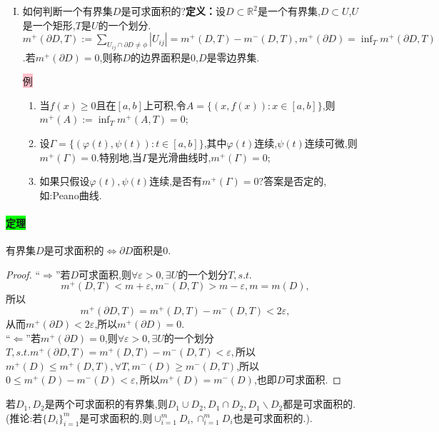 \documentclass[UTF8]{ctexart}
\renewcommand{\d}{\mathrm{d}}
\begin{document}
\begin{enumerate}[I)]
\begin{enumerate}[$\cdot$)]
\begin{enumerate}[1)]
\begin{proof}
                    又因为$f$可积,所以$\lim_{\lambda\to0}\sum_{i=1}^nm_i\Delta x_i=\lim_{\lambda\to0}\sum_{i=1}^nM_i\Delta x_i=\int_a^bf(x)\d x$,也即$m^-(D)=m^+(D)=\int_a^bf(x)\d x$,从而$D$是可求面积的,而且$m(D)=\int_a^bf(x)\d x$.
                \end{proof}
            \end{enumerate}
        \end{enumerate}
        \item 如何判断一个有界集$D$是可求面积的?\textbf{定义：}设$D\subset\mathbb{R}^2$是一个有界集,$D\subset U$,$U$是一个矩形,$T$是$U$的一个划分.$m^+(\partial D,T):=\sum_{U_{ij}\cap\partial D\not=\phi}|U_{ij}|=m^+(D,T)-m^-(D,T),m^+(\partial D)=\inf_Tm^+(\partial D,T)$.若$m^+(\partial D)=0$,则称$D$的边界面积是0,$D$是零边界集.
        
        \colorbox{pink}{例}
        \begin{enumerate}
            \item 当$f(x)\ge 0$且在$[a,b]$上可积,令$A=\{(x,f(x)):x\in[a,b]\}$,则$m^+(A):=\inf_Tm^+(A,T)=0$;
            \item 设$\Gamma=\{(\varphi(t),\psi(t)):t\in[a,b]\}$,其中$\varphi(t)$连续,$\psi(t)$连续可微,则$m^+(\Gamma)=0$.特别地,当$\Gamma$是光滑曲线时,$m^+(\Gamma)=0$;
            \item 如果只假设$\varphi(t),\psi(t)$连续,是否有$m^+(\Gamma)=0$?答案是否定的,如:Peano曲线.
        \end{enumerate}
    \end{enumerate}

    \paragraph{\colorbox{lime}{定理}}有界集$D$是可求面积的$\Leftrightarrow\partial D$面积是0.
    \begin{proof}
        ``$\Rightarrow$''若$D$可求面积,则$\forall\varepsilon>0,\exists U$的一个划分$T,s.t.$ $$m^+(D,T)<m+\varepsilon,m^-(D,T)>m-\varepsilon,m=m(D),$$所以
        $$m^+(\partial D,T)=m^+(D,T)-m^-(D,T)<2\varepsilon,$$从而$m^+(\partial D)<2\varepsilon$,所以$m^+(\partial D)=0$.\\
        ``$\Leftarrow$''若$m^+(\partial D)=0$,则$\forall\varepsilon>0,\exists U$的一个划分$T,s.t.m^+(\partial D,T)=m^+(D,T)-m^-(D,T)<\varepsilon,$所以$m^+(D)\le m^+(D,T),\forall T,m^-(D)\ge m^-(D,T)$,所以$0\le m^+(D)-m^-(D)<\varepsilon,$所以$m^+(D)=m^-(D)$,也即$D$可求面积.
    \end{proof}
    若$D_1,D_2$是两个可求面积的有界集,则$D_1\cup D_2,D_1\cap D_2,D_1\backslash D_2$都是可求面积的.(推论:若$\{D_i\}_{i=1}^m$是可求面积的,则$\cup_{i=1}^mD_i,\cap_{i=1}^mD_i$也是可求面积的.).
\end{document}
